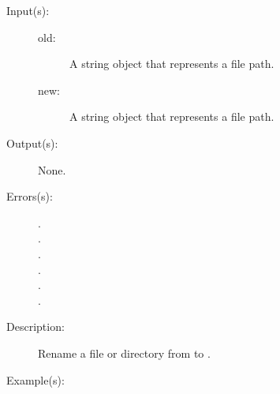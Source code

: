 \begin{description}
\begin{description}
\begin{verbatim}
		\end{verbatim}
	\end{description}
\label{systemdict:rename}
\item[{\onyxop{old new}{rename}{--}}: ]
	\begin{description}\item[]
	\item[Input(s): ]
		\begin{description}\item[]
		\item[old: ]
			A string object that represents a file path.
		\item[new: ]
			A string object that represents a file path.
		\end{description}
	\item[Output(s): ] None.
	\item[Errors(s): ]
		\begin{description}\item[]
		\item[.]
		\item[.]
		\item[.]
		\item[.]
		\item[.]
		\item[.]
		\end{description}
	\item[Description: ]
		Rename a file or directory from  to .
	\item[Example(s): ]\begin{verbatim}


\end{verbatim}
\end{description}
\end{description}
